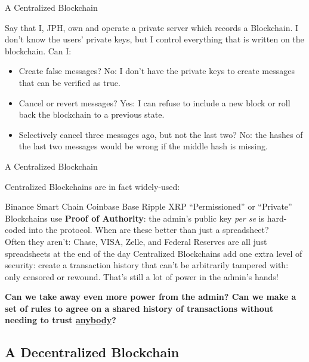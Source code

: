 \documentclass[aspectratio=169]{beamer}
\begin{document}
\begin{frame}{A Centralized Blockchain}

Say that I, JPH, own and operate a private server which records a Blockchain. I don't know the users' private keys, but I control everything that is written on the blockchain. Can I: \pause 
\begin{itemize}
    \item Create false messages? \pause 
    \bi 
    \m No: I don't have the private keys to create messages that can be verified as true. \pause 
    \ei 
    \item Cancel or revert messages? \pause
    \bi 
    \m Yes: I can refuse to include a new block or roll back the blockchain to a previous state. \pause 
    \ei 
    \item Selectively cancel three messages ago, but not the last two? \pause 
    \bi 
    \m No: the hashes of the last two messages would be wrong if the middle hash is missing. 
    \ei 
\end{itemize}
    
\end{frame}

\begin{frame}{A Centralized Blockchain}

Centralized Blockchains are in fact widely-used: 

\bi 
\m Binance Smart Chain 
\m Coinbase Base 
\m Ripple XRP 
\m ``Permissioned'' or ``Private'' Blockchains use \textbf{Proof of Authority}: the admin's public key \emph{per se} is hard-coded into the protocol. 
\ei \pause 
When are these better than just a spreadsheet? \pause \\ 
\bi 
\m Often they aren't: Chase, VISA, Zelle, and Federal Reserves are all just spreadsheets at the end of the day \pause 
\m Centralized Blockchains add one extra level of security: create a transaction history that can't be arbitrarily tampered with: only censored or rewound. \pause  
\m That's still a lot of power in the admin's hands! \pause 
\ei 

\textbf{Can we take away even more power from the admin? Can we make a set of rules to agree on a shared history of transactions without needing to trust \ul{anybody}?}

\end{frame}


\subsection{A Decentralized Blockchain}
\end{document}
